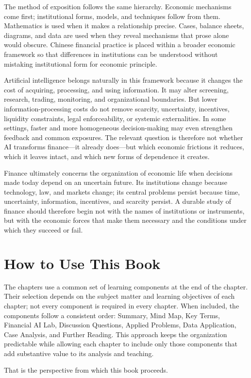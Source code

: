 The method of exposition follows the same hierarchy. Economic mechanisms come first; institutional forms, models, and techniques follow from them. Mathematics is used when it makes a relationship precise. Cases, balance sheets, diagrams, and data are used when they reveal mechanisms that prose alone would obscure. Chinese financial practice is placed within a broader economic framework so that differences in institutions can be understood without mistaking institutional form for economic principle.

Artificial intelligence belongs naturally in this framework because it changes the cost of acquiring, processing, and using information. It may alter screening, research, trading, monitoring, and organizational boundaries. But lower information-processing costs do not remove scarcity, uncertainty, incentives, liquidity constraints, legal enforceability, or systemic externalities. In some settings, faster and more homogeneous decision-making may even strengthen feedback and common exposures. The relevant question is therefore not whether AI transforms finance---it already does---but which economic frictions it reduces, which it leaves intact, and which new forms of dependence it creates.

Finance ultimately concerns the organization of economic life when decisions made today depend on an uncertain future. Its institutions change because technology, law, and markets change; its central problems persist because time, uncertainty, information, incentives, and scarcity persist. A durable study of finance should therefore begin not with the names of institutions or instruments, but with the economic forces that make them necessary and the conditions under which they succeed or fail.

\section*{How to Use This Book}

The chapters use a common set of learning components at the end of the chapter. Their selection depends on the subject matter and learning objectives of each chapter; not every component is required in every chapter. When included, the components follow a consistent order: Summary, Mind Map, Key Terms, Financial AI Lab, Discussion Questions, Applied Problems, Data Application, Case Analysis, and Further Reading. This approach keeps the organization predictable while allowing each chapter to include only those components that add substantive value to its analysis and teaching.

That is the perspective from which this book proceeds.
